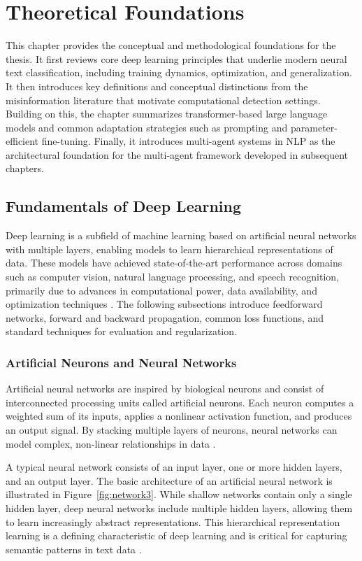 \chapter{Theoretical Foundations}

This chapter provides the conceptual and methodological foundations for the thesis. It first reviews core deep learning principles that underlie modern neural text classification, including training dynamics, optimization, and generalization. It then introduces key definitions and conceptual distinctions from the misinformation literature that motivate computational detection settings. Building on this, the chapter summarizes transformer-based large language models and common adaptation strategies such as prompting and parameter-efficient fine-tuning. Finally, it introduces multi-agent 
systems in NLP as the architectural foundation for the multi-agent framework developed in subsequent chapters.

\section{Fundamentals of Deep Learning}

Deep learning is a subfield of machine learning based on artificial neural networks with multiple layers, enabling models to learn hierarchical representations of data. These models have achieved state-of-the-art performance across domains such as computer vision, natural language processing, and speech recognition, primarily due to advances in computational power, data availability, and optimization techniques \cite{RAZAVI2021105159}. The following subsections introduce feedforward networks, forward and backward propagation, common loss functions, and standard techniques for evaluation and regularization.

\subsection{Artificial Neurons and Neural Networks}

Artificial neural networks are inspired by biological neurons and consist of interconnected processing units called artificial neurons. Each neuron computes a weighted sum of its inputs, applies a nonlinear activation function, and produces an output signal. By stacking multiple layers of neurons, neural networks can model complex, non-linear relationships in data \cite{hammad2024artificialneuralnetworkdeep}. 

A typical neural network consists of an input layer, one or more hidden layers, and an output layer. The basic architecture of an artificial neural network is illustrated in Figure~\ref{fig:network3}. While shallow networks contain only a single hidden layer, deep neural networks include multiple hidden layers, allowing them to learn increasingly abstract representations. This hierarchical representation learning is a defining characteristic of deep learning and is critical for capturing semantic patterns in text data \cite{raghu2020surveydeeplearningscientific}.

